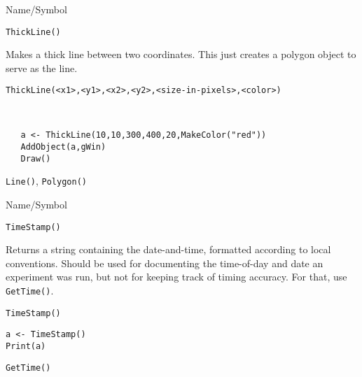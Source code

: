 \begin{desc}{Name/Symbol}
\item[Name/Symbol]  	\verb+ThickLine()+	

\item[Description] 	Makes a thick line between two coordinates. This just creates
  a polygon object to serve as the line.

\item[Usage]       	
\begin{verbatim}
ThickLine(<x1>,<y1>,<x2>,<y2>,<size-in-pixels>,<color>)
\end{verbatim}

\item[Example]
\begin{verbatim}
   

   a <- ThickLine(10,10,300,400,20,MakeColor("red"))
   AddObject(a,gWin)
   Draw()

\end{verbatim}

\item[See Also]  \verb+Line()+, \verb+Polygon()+
\end{desc}
\rl


\begin{desc}{Name/Symbol}
\item[Name/Symbol]  	\verb+TimeStamp()+

\item[Description] Returns a string containing the date-and-time,
  formatted according to local conventions. Should be used for
  documenting the time-of-day and date an experiment was run, but not
  for keeping track of timing accuracy.  For that, use
  \verb+GetTime()+.
	     
\item[Usage]
\begin{verbatim}
TimeStamp()
\end{verbatim}

\item[Example]
\begin{verbatim}
a <- TimeStamp()
Print(a)
\end{verbatim}

\item[See Also]     	\verb+GetTime()+
\end{desc}

\rl


